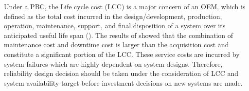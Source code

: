 \documentclass[preprint,12pt]{elsarticle}
\begin{document}



Under a PBC, the Life cycle cost (LCC) is a major concern of an OEM, which is defined as the total cost incurred in the design/development, production, operation, maintenance, support, and final disposition of a system over its anticipated useful life span (\citet{Barringer}). The results of \citet{Oner2007} showed that the combination of maintenance cost and downtime cost is larger than the acquisition cost and constitute a significant portion of the LCC. These service costs are incurred by system failures which are highly dependent on system designs. Therefore, reliability design decision should be taken under the consideration of LCC and system availability target before investment decisions on new systems are made.
\end{document}
